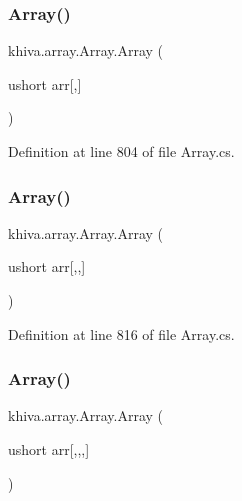 \subsubsection{\texorpdfstring{Array()}{Array()}\hspace{0.1cm}{\footnotesize\ttfamily [42/46]}}
{\footnotesize\ttfamily khiva.\+array.\+Array.\+Array (\begin{DoxyParamCaption}\item[{ushort}]{arr\mbox{[},\mbox{]} }\end{DoxyParamCaption})\hspace{0.3cm}{\ttfamily [inline]}}



Definition at line 804 of file Array.\+cs.

\mbox{\label{classkhiva_1_1array_1_1_array_a9c7d71ca30c2b0d3a332a5925db2015a}} 
\subsubsection{\texorpdfstring{Array()}{Array()}\hspace{0.1cm}{\footnotesize\ttfamily [43/46]}}
{\footnotesize\ttfamily khiva.\+array.\+Array.\+Array (\begin{DoxyParamCaption}\item[{ushort}]{arr\mbox{[},,\mbox{]} }\end{DoxyParamCaption})\hspace{0.3cm}{\ttfamily [inline]}}



Definition at line 816 of file Array.\+cs.

\mbox{\label{classkhiva_1_1array_1_1_array_aa372a9219b251025eb8462cfc7491d11}} 
\subsubsection{\texorpdfstring{Array()}{Array()}\hspace{0.1cm}{\footnotesize\ttfamily [44/46]}}
{\footnotesize\ttfamily khiva.\+array.\+Array.\+Array (\begin{DoxyParamCaption}\item[{ushort}]{arr\mbox{[},,,\mbox{]} }\end{DoxyParamCaption})\hspace{0.3cm}{\ttfamily [inline]}}



